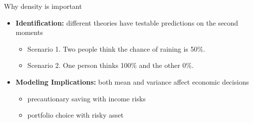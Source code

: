 \documentclass{beamer}
\begin{document}
\begin{frame}{Why density is important}
\begin{itemize}
\item \textbf{Identification:} different theories have testable predictions on the second moments   
	\begin{itemize}
		\item Scenario 1. Two people think the chance of raining is 50\%. 
		\item Scenario 2. One person thinks 100\% and the other 0\%. 
	\end{itemize}
\item \textbf{Modeling Implications:}  both mean and variance affect economic decisions
\begin{itemize}
	\item precautionary saving with income risks
	\item portfolio choice with risky asset
\end{itemize} 
\end{itemize}
\end{frame}

%
\end{document}
